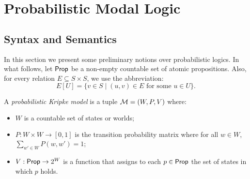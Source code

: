 \section{Probabilistic Modal Logic}
\label{sec:pml}

\subsection{Syntax and Semantics}

In this section we present some preliminary notions over probabilistic logics. 
In what follows, let $\mathsf{Prop}$ be a non-empty countable set of atomic propositions. Also, for every relation $E\subseteq S\times S$, we use the abbreviation:
\[ 
    E[U]=\{v \in S  \mid (u,v)\in E \text{ for some }u\in U \}. 
\] 

\begin{definition} A \emph{probabilistic Kripke model} is a tuple $\mathcal{M}=(W,P, V)$ where:

\begin{itemize}
    \item $W$ is a countable set of states or worlds; 
    \item $P : W \times W \rightarrow [0,1]$ is the transition probability matrix where for all $w \in W$, $\displaystyle\sum_{w' \in W} P(w, w') = 1$;
    \item $V : \mathsf{Prop} \rightarrow 2^W$ is a function that assigns to each $p \in \mathsf{Prop}$ the set of states in which $p$ holds.
\end{itemize}
\end{definition}




